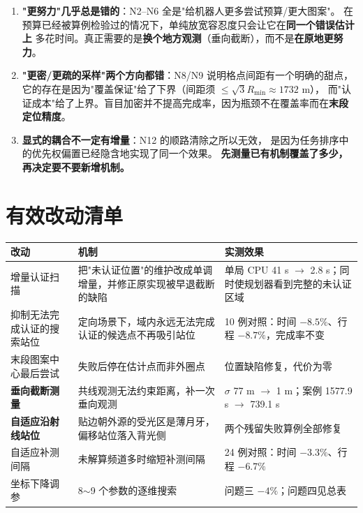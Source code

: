 \begin{enumerate}[leftmargin=1.8em]
  \item \textbf{"更努力"几乎总是错的}：N2--N6 全是"给机器人更多尝试预算/更大图案"。
        在预算已经被算例检验过的情况下，单纯放宽容忍度只会让它在\textbf{同一个错误估计上}
        多花时间。真正需要的是\textbf{换个地方观测}（垂向截断），而不是\textbf{在原地更努力}。
  \item \textbf{"更密/更疏的采样"两个方向都错}：N8/N9 说明格点间距有一个明确的甜点，
        它的存在是因为"覆盖保证"给了下界（间距须 $\le\sqrt3 R_{\min}\approx1732$ m），
        而"认证成本"给了上界。盲目加密并不提高完成率，因为瓶颈不在覆盖率而在\textbf{末段定位精度}。
  \item \textbf{显式的耦合不一定有增量}：N12 的顺路清除之所以无效，
        是因为任务排序中的优先权偏置已经隐含地实现了同一个效果。
        \textbf{先测量已有机制覆盖了多少，再决定要不要新增机制。}
\end{enumerate}

\section{有效改动清单}

\begin{longtable}{p{3.4cm}p{4.4cm}p{6.2cm}}
\toprule
改动 & 机制 & 实测效果 \\ \midrule
\endhead
增量认证扫描 & 把"未认证位置"的维护改成单调增量，并修正原实现被早退截断的缺陷 &
单局 CPU 41 s $\to$ 2.8 s；同时使规划器看到完整的未认证区域 \\
抑制无法完成认证的搜索站位 & 定向场景下，域内永远无法完成认证的候选点不再吸引站位 &
10 例对照：时间 $-8.5\%$、行程 $-8.7\%$，完成率不变 \\
末段图案中心最后尝试 & 失败后停在估计点而非外圈点 & 位置缺陷修复，代价为零 \\
\textbf{垂向截断测量} & 共线观测无法约束距离，补一次垂向观测 &
$\sigma$ 77 m $\to$ 1 m；案例 1577.9 s $\to$ 739.1 s \\
\textbf{自适应沿射线站位} & 贴边朝外源的受光区是薄月牙，偏移站位落入背光侧 &
两个残留失败算例全部修复 \\
自适应补测间隔 & 未解算频道多时缩短补测间隔 & 24 例对照：时间 $-3.3\%$、行程 $-6.7\%$ \\
坐标下降调参 & 8$\sim$9 个参数的逐维搜索 & 问题三 $-4\%$；问题四见总表 \\
\bottomrule
\end{longtable}

